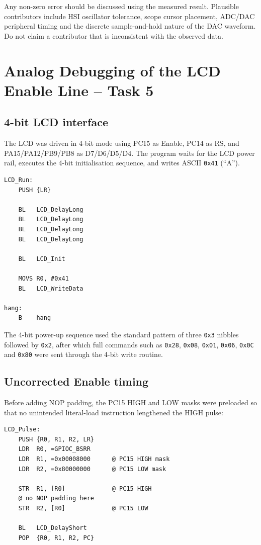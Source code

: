 \documentclass[11pt,a4paper]{article}
\begin{document}
Any non-zero error should be discussed using the measured result. Plausible contributors include HSI oscillator tolerance, scope cursor placement, ADC/DAC peripheral timing and the discrete sample-and-hold nature of the DAC waveform. Do not claim a contributor that is inconsistent with the observed data.

\section{Analog Debugging of the LCD Enable Line -- Task 5}

\subsection{4-bit LCD interface}
The LCD was driven in 4-bit mode using PC15 as Enable, PC14 as RS, and PA15/PA12/PB9/PB8 as D7/D6/D5/D4. The program waits for the LCD power rail, executes the 4-bit initialisation sequence, and writes ASCII \texttt{0x41} (``A'').

\begin{lstlisting}[caption={Task 5 entry point and character write.}]
LCD_Run:
    PUSH {LR}

    BL   LCD_DelayLong
    BL   LCD_DelayLong
    BL   LCD_DelayLong
    BL   LCD_DelayLong

    BL   LCD_Init

    MOVS R0, #0x41
    BL   LCD_WriteData

hang:
    B    hang
\end{lstlisting}

The 4-bit power-up sequence used the standard pattern of three \texttt{0x3} nibbles followed by \texttt{0x2}, after which full commands such as \texttt{0x28}, \texttt{0x08}, \texttt{0x01}, \texttt{0x06}, \texttt{0x0C} and \texttt{0x80} were sent through the 4-bit write routine.

\subsection{Uncorrected Enable timing}
Before adding NOP padding, the PC15 HIGH and LOW masks were preloaded so that no unintended literal-load instruction lengthened the HIGH pulse:

\begin{lstlisting}[caption={Uncorrected Enable pulse used for the failing-case measurement.}]
LCD_Pulse:
    PUSH {R0, R1, R2, LR}
    LDR  R0, =GPIOC_BSRR
    LDR  R1, =0x00008000      @ PC15 HIGH mask
    LDR  R2, =0x80000000      @ PC15 LOW mask

    STR  R1, [R0]             @ PC15 HIGH
    @ no NOP padding here
    STR  R2, [R0]             @ PC15 LOW

    BL   LCD_DelayShort
    POP  {R0, R1, R2, PC}
\end{lstlisting}
\end{document}
